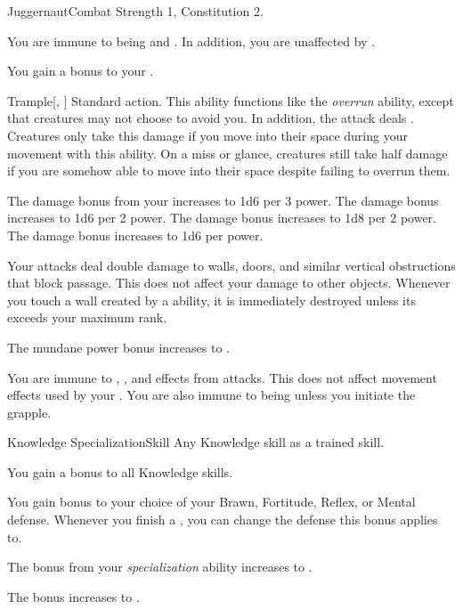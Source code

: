   \begin{feat}{Juggernaut}{Combat}
    \featpre Strength 1, Constitution 2.

     You are immune to being \slowed and \paralyzed.
    In addition, you are unaffected by .

     You gain a  bonus to your .

    \begin{activeability}{Trample}[, ]
      \abilityusagetime Standard action.
      \rankline
      This ability functions like the \textit{overrun} ability, except that creatures may not choose to avoid you.
      In addition, the attack deals \damageranktwo.
      Creatures only take this damage if you move into their space during your movement with this ability.
      On a miss or glance, creatures still take half damage if you are somehow able to move into their space despite failing to overrun them.

      \rankline
       The damage bonus from your  increases to 1d6 per 3 power.
       The damage bonus increases to 1d6 per 2 power.
       The damage bonus increases to 1d8 per 2 power.
       The damage bonus increases to 1d6 per power.
    \end{activeability}

     Your attacks deal double damage to walls, doors, and similar vertical obstructions that block passage.
    This does not affect your damage to other objects.
    Whenever you touch a wall created by a  ability, it is immediately destroyed unless its  exceeds your maximum rank.

     The mundane power bonus increases to .

     You are immune to , , and  effects from attacks.
    This does not affect movement effects used by your .
    You are also immune to being \grappled unless you initiate the grapple.
  \end{feat}

  \begin{feat}{Knowledge Specialization}{Skill}
    \featpre Any Knowledge skill as a trained skill.

     You gain a  bonus to all Knowledge skills.

     You gain  bonus to your choice of your Brawn, Fortitude, Reflex, or Mental defense.
    Whenever you finish a , you can change the defense this bonus applies to.

     The bonus from your \textit{specialization} ability increases to .

     The bonus increases to .
  \end{feat}

